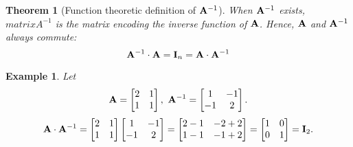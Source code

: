 \documentclass[12pt, a4paper]{article}
\newtheorem{thm}{Theorem}[subsection]
\newtheorem{eg}{Example}[subsection]
\def\matrixA{\vb{A}}
\def\matrixI{\vb{I}}
\begin{document}
\begin{thm}[Function theoretic definition of $\matrixA^{-1}$]
	When $\matrixA^{-1}$ exists, $matrixA^{-1}$ is the matrix encoding the inverse function of $\matrixA$. Hence, $\matrixA$ and $\matrixA^{-1}$ always commute: \[\matrixA^{-1}\cdot\matrixA=\matrixI_n=\matrixA\cdot\matrixA^{-1}\]	
\end{thm}
\begin{eg}
	Let \[\matrixA=\begin{bmatrix}2&1\\1&1\end{bmatrix},\ \matrixA^{-1}=\begin{bmatrix}1&-1\\-1&2\end{bmatrix}.\]
	\[\matrixA\cdot\matrixA^{-1}=\begin{bmatrix}2&1\\1&1\end{bmatrix}\begin{bmatrix}1&-1\\-1&2\end{bmatrix}=\begin{bmatrix}2-1&-2+2\\1-1&-1+2\end{bmatrix}=\begin{bmatrix}1&0\\0&1\end{bmatrix}=\matrixI_2.\]
\end{eg}
\end{document}
